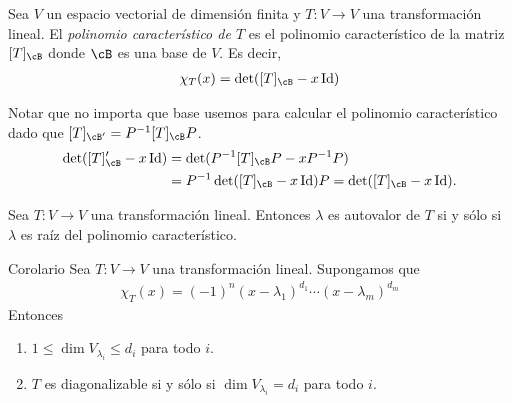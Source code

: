\documentclass[handout]{beamer} %
\newcommand{\Id}{\operatorname{Id}}
\begin{document}
\begin{frame}
    
    \begin{definicion}
        Sea $V$ un espacio vectorial de dimensión finita y $T:V\longrightarrow V$ una transformación lineal.
        El \textit{polinomio característico de $T$} es el polinomio característico de la matriz $[T]_\cB$ donde $\cB$ es una base de $V$. Es decir,
        \begin{align*}
            \chi_T(x)=\det([T]_\cB-x\Id) 
        \end{align*}
    \end{definicion}\pause
    
    \begin{observacion}
        Notar que no importa que base usemos para calcular el polinomio característico dado que $[T]_{\cB'}=P^{-1}[T]_{\cB}P$.
        \begin{align*}
        \det([T]_\cB'-x\Id)  &= \det(P^{-1}[T]_\cB P-xP^{-1}P) \\
        &= P^{-1}\det([T]_\cB -x\Id)P = \det([T]_\cB-x\Id). 
        \end{align*}
    \end{observacion}
    
\end{frame}

\begin{frame}
    \begin{proposicion}
        Sea $T:V\longrightarrow V$ una transformación lineal. Entonces
        $\lambda$ es autovalor de $T$ si y sólo si $\lambda$ es raíz del polinomio característico.
    \end{proposicion}\pause
    
    \begin{block}{Corolario}
        Sea $T:V\longrightarrow V$ una transformación lineal. Supongamos que 
        \begin{align*}
            \chi_T(x)=(-1)^n (x-\lambda_1)^{d_1}\cdots (x-\lambda_m)^{d_m}
        \end{align*}
        Entonces 
        \begin{enumerate}
            \item $1\leq\dim V_{\lambda_i}\leq d_i$ para todo $i$.
            \item $T$ es diagonalizable si y sólo si $\dim V_{\lambda_i}=d_i$ para todo $i$.
        \end{enumerate}
    \end{block}
\end{frame}
\end{document}
